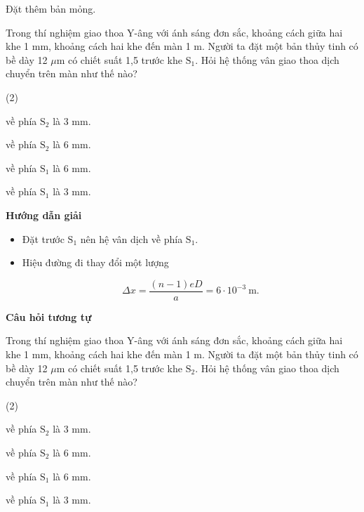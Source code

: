 \begin{dang}{Đặt thêm bản mỏng.}


{
Trong thí nghiệm giao thoa  Y-âng với ánh sáng đơn sắc, khoảng cách giữa hai khe 1 mm, khoảng cách hai khe đến màn 1 m. Người ta đặt một bản thủy tinh có bề dày 12 $\mu$m có chiết suất 1,5 trước khe $\text{S}_1$. Hỏi hệ thống vân giao thoa dịch chuyển trên màn như thế nào?
\begin{mcq}(2)
\item về phía $\text{S}_2$ là 3 mm.					
\item về phía $\text{S}_2$  là 6 mm.
\item về phía $\text{S}_1$ là 6 mm.					
\item về phía $\text{S}_1$ là 3 mm.
\end{mcq}}
{
\begin{center}
	\textbf{Hướng dẫn giải}
\end{center}

\begin{itemize}
	\item Đặt trước $\text{S}_1$ nên hệ vân dịch về phía $\text{S}_1$.
	\item Hiệu đường đi thay đổi một lượng 
	
	\begin{equation*}
		\Delta x =\dfrac{(n-1)eD}{a}= 6 \cdot 10^{-3}\ \text{m}.
	\end{equation*}
\end{itemize}

\begin{center}
	\textbf{Câu hỏi tương tự}
\end{center}

Trong thí nghiệm giao thoa  Y-âng với ánh sáng đơn sắc, khoảng cách giữa hai khe 1 mm, khoảng cách hai khe đến màn 1 m. Người ta đặt một bản thủy tinh có bề dày 12 $\mu$m có chiết suất 1,5 trước khe $\text{S}_2$. Hỏi hệ thống vân giao thoa dịch chuyển trên màn như thế nào?
\begin{mcq}(2)
\item về phía $\text{S}_2$ là 3 mm.					
\item về phía $\text{S}_2$  là 6 mm.
\item về phía $\text{S}_1$ là 6 mm.					
\item về phía $\text{S}_1$ là 3 mm.
\end{mcq}

}
\end{dang}
